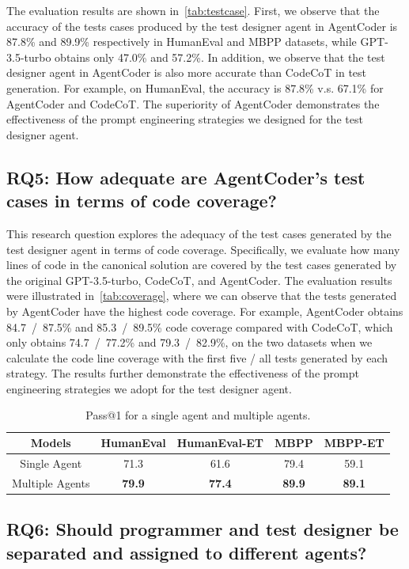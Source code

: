 \documentclass[manuscript,screen,review]{acmart}
\newcommand{\xxx}{AgentCoder\xspace}
\begin{document}
The evaluation results are shown in~\cref{tab:testcase}.
First, we observe that the accuracy of the tests cases produced by the test designer agent in \xxx is 87.8\% and 89.9\% respectively in HumanEval and MBPP datasets, while GPT-3.5-turbo obtains only 47.0\% and 57.2\%. 
In addition, we observe that the test designer agent in \xxx is also more accurate than CodeCoT in test generation.
For example, on HumanEval, the accuracy is 87.8\% v.s. 67.1\% for \xxx and CodeCoT. 
The superiority of \xxx demonstrates the effectiveness of the prompt engineering strategies we designed for the test designer agent. 




\subsection{RQ5: How adequate are \xxx's test cases in terms of code coverage?}
This research question explores the adequacy of the test cases generated by the test designer agent in terms of code coverage. Specifically, we evaluate how many lines of code in the canonical solution are covered by the test cases generated by the original GPT-3.5-turbo, CodeCoT, and \xxx. The evaluation results were illustrated in~\cref{tab:coverage}, where we can observe that the tests generated by \xxx have the highest code coverage. For example, \xxx obtains 84.7~/~87.5\% and 85.3~/~89.5\% code coverage compared with CodeCoT, which only obtains 74.7~/~77.2\% and 79.3~/~82.9\%, on the two datasets when we calculate the code line coverage with the first five / all tests generated by each strategy. The results further demonstrate the effectiveness of the prompt engineering strategies we adopt for the test designer agent.

\begin{table}[h!]
    \centering
    \caption{Pass@1 for a single agent and multiple agents.}
    \begin{tabular}{c|cccc}
    \toprule
         Models&HumanEval&HumanEval-ET&MBPP&MBPP-ET  \\
         \midrule
         Single Agent&71.3&61.6&79.4&59.1 \\
         Multiple Agents&\textbf{79.9}&\textbf{77.4}&\textbf{89.9}&\textbf{89.1}\\
         \bottomrule
    \end{tabular}
    \label{tab:single_agent_code}
\end{table}

\subsection{RQ6: Should programmer and test designer be separated and assigned to different agents?}
\end{document}
